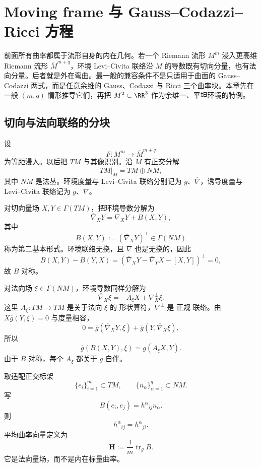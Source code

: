 \chapter{Moving frame 与 Gauss--Codazzi--Ricci 方程}

前面所有曲率都属于流形自身的内在几何。若一个 Riemann 流形 $M^m$ 浸入更高维 Riemann 流形 $\overline M^{m+q}$，环境 Levi--Civita 联络沿 $M$ 的导数既有切向分量，也有法向分量。后者就是外在弯曲。最一般的兼容条件不是只适用于曲面的 Gauss--Codazzi 两式，而是任意余维的 Gauss、Codazzi 与 Ricci 三个曲率块。本章先在一般 $(m,q)$ 情形推导它们，再把 $M^2\subset\RR^3$ 作为余维一、平坦环境的特例。

\section{切向与法向联络的分块}

设
\[
F:M^m\longrightarrow\overline M^{m+q}
\]
为等距浸入。以后把 $TM$ 与其像识别。沿 $M$ 有正交分解
\[
T\overline M|_M=TM\oplus NM,
\]
其中 $NM$ 是法丛。环境度量与 Levi--Civita 联络分别记为 $\overline g$、$\overline\nabla$，诱导度量与 Levi--Civita 联络记为 $g$、$\nabla$。

对切向量场 $X,Y\in\Gamma(TM)$，把环境导数分解为
\begin{equation*}\boxed{
\overline\nabla_XY
=\nabla_XY+B(X,Y),}
\end{equation*}
其中
\[
B(X,Y):=(\overline\nabla_XY)^\perp\in\Gamma(NM)
\]
称为第二基本形式。环境联络无挠，且 $\nabla$ 也是无挠的，因此
\[
B(X,Y)-B(Y,X)
=(\overline\nabla_XY-\overline\nabla_YX-[X,Y])^\perp=0,
\]
故 $B$ 对称。

对法向场 $\xi\in\Gamma(NM)$，环境导数同样分解为
\begin{equation*}\boxed{
\overline\nabla_X\xi
=-A_\xi X+\nabla_X^\perp\xi.}
\end{equation*}
这里 $A_\xi:TM\to TM$ 是关于法向 $\xi$ 的 形状算符，$\nabla^\perp$ 是 正规 联络。由 $X\overline g(Y,\xi)=0$ 与度量相容，
\[
0=\overline g(\overline\nabla_XY,\xi)
+\overline g(Y,\overline\nabla_X\xi),
\]
所以
\begin{equation}\label{eq:math-dg-shape-second-form-relation}
\boxed{
\overline g(B(X,Y),\xi)
=g(A_\xi X,Y).}
\end{equation}
由于 $B$ 对称，每个 $A_\xi$ 都关于 $g$ 自伴。

取适配正交标架
\[
\{e_i\}_{i=1}^m\subset TM,
\qquad
\{n_\alpha\}_{\alpha=1}^q\subset NM.
\]
写
\[
B(e_i,e_j)=h^\alpha{}_{ij}n_\alpha.
\]
则
\[
h^\alpha{}_{ij}=h^\alpha{}_{ji}.
\]
平均曲率向量定义为
\begin{equation*}\mathbf H
:=\frac1m\operatorname{tr}_gB.
\end{equation*}
它是法向量场，而不是内在标量曲率。




